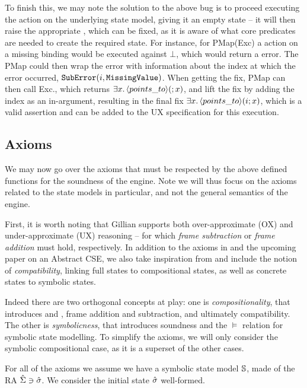 To finish this, we may note the solution to the above bug is to proceed executing the action on the underlying state model, giving it an empty state -- it will then raise the appropriate \Miss{}, which can be fixed, as it is aware of what core predicates are needed to create the required state. For instance, for PMap(Exc) a  action on a missing binding would be executed against $\bot$, which would return a  error. The PMap could then wrap the error with information about the index at which the error occurred, $\texttt{SubError}(i, \texttt{MissingValue})$. When getting the fix, PMap can then call Exc.\fix, which returns $\exists x\ldotp \left<points\_to\right>\!(;x)$, and lift the fix by adding the index as an in-argument, resulting in the final fix $\exists x\ldotp\left<points\_to\right>\!(i;x)$, which is a valid assertion and can be added to the UX specification for this execution.

\subsection{Axioms}

We may now go over the axioms that must be respected by the above defined functions for the soundness of the engine. Note we will thus focus on the axioms related to the state models in particular, and not the general semantics of the engine.

First, it is worth noting that Gillian supports both over-approximate (OX) and under-approximate (UX) reasoning -- for which \emph{frame subtraction} or \emph{frame addition} must hold, respectively. In addition to the axioms in \cite{cse1} and the upcoming paper on an Abstract CSE, we also take inspiration from \cite{sacha-phd} and include the notion of \emph{compatibility}, linking full states to compositional states, as well as concrete states to symbolic states.

Indeed there are two orthogonal concepts at play: one is \emph{compositionality}, that introduces \consume{} and \produce{}, frame addition and subtraction, and ultimately compatibility. The other is \emph{symbolicness}, that introduces soundness and the $\vDash$ relation for symbolic state modelling. To simplify the axioms, we will only consider the symbolic compositional case, as it is a superset of the other cases.

For all of the axioms we assume we have a symbolic state model $\mathbb S$, made of the RA $\hat{\Sigma} \ni \hat{\sigma}$. We consider the initial state $\hat{\sigma}$ well-formed.%

